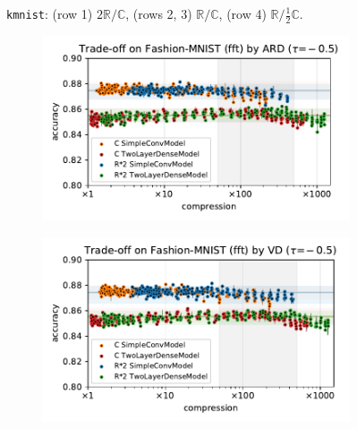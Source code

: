 \documentclass[a4paper,10pt,onecolumn]{article}
\newcommand{\real}{\mathbb{R}}
\newcommand{\cplx}{\mathbb{C}}
\begin{document}
\begin{figure}[b]
\begin{subfigure}[b]{0.5\columnwidth}
  \end{subfigure}
  \caption{%
    \texttt{kmnist}: (row 1) $2\real / \cplx$, (rows 2, 3) $\real / \cplx$, (row 4) $\real / \tfrac12\cplx$.
  }
\end{figure}

\begin{figure}[b]
  \centering
  \begin{subfigure}[b]{0.5\columnwidth}
    \centering
    \includegraphics[width=\columnwidth]{figure__mnist-like__trade-off/appendix__cmp__ARD__fashionmnist__fft__-0.5.pdf}
  \end{subfigure}%
  \begin{subfigure}[b]{0.5\columnwidth}
    \centering
    \includegraphics[width=\columnwidth]{figure__mnist-like__trade-off/appendix__cmp__VD__fashionmnist__fft__-0.5.pdf}
  \end{subfigure} \\%
  \begin{subfigure}[b]{0.5\columnwidth}

\end{subfigure}
\end{figure}
\end{document}
